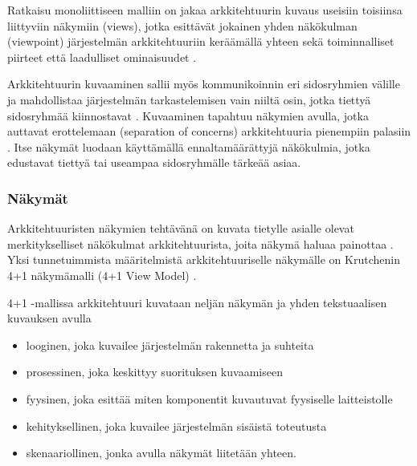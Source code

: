 \documentclass[finnish]{tktltiki2}
\theoremstyle{definition}
\theoremstyle{remark}
\begin{document}
Ratkaisu monoliittiseen malliin on jakaa arkkitehtuurin kuvaus useisiin toisiinsa liittyviin näkymiin (views), jotka esittävät jokainen yhden näkökulman (viewpoint) järjestelmän arkkitehtuuriin keräämällä yhteen sekä toiminnalliset piirteet että laadulliset ominaisuudet \citetext{\citealp[s. 33-34]{Rozanski:2011:SSA:2072649}; \citealp[s. 8-9]{gorton_understanding_2011}; \citealp[s. 117]{Ran:1998:ASV:288408.288438}}.

Arkkitehtuurin kuvaaminen sallii myös kommunikoinnin eri sidosryhmien välille ja mahdollistaa järjestelmän tarkastelemisen vain niiltä osin, jotka tiettyä sidosryhmää kiinnostavat \citetext{\citealp[s. 329]{ARaHVeSCiSDu}; \citealp[s. 60]{Brondum:2010:TAV:1833335.1833344}}. Kuvaaminen tapahtuu näkymien avulla, jotka auttavat erottelemaan (separation of concerns) arkkitehtuuria pienempiin palasiin \citep[s. 2]{Galster:2011:DTC:2031759.2031761}. Itse näkymät luodaan käyttämällä ennaltamäärättyjä näkökulmia, jotka edustavat tiettyä tai useampaa sidosryhmälle tärkeää asiaa. 


\subsubsection{Näkymät}
Arkkitehtuuristen näkymien tehtävänä on kuvata tietylle asialle olevat merkitykselliset näkökulmat arkkitehtuurista, joita näkymä haluaa painottaa \citetext{\citealp[s. 34]{Rozanski:2011:SSA:2072649}; \citealp[s. 15]{may2005survey}}. Yksi tunnetuimmista määritelmistä arkkitehtuuriselle näkymälle on Krutchenin 4+1 näkymämalli (4+1 View Model) \citep[s.7-8]{gorton_understanding_2011}. 

4+1 -mallissa arkkitehtuuri kuvataan neljän näkymän ja yhden tekstuaalisen kuvauksen avulla 

\begin{itemize}
	\item looginen, joka kuvailee järjestelmän rakennetta ja suhteita
	\item prosessinen, joka keskittyy suorituksen kuvaamiseen
	\item fyysinen, joka esittää miten komponentit kuvautuvat fyysiselle laitteistolle
	\item kehityksellinen, joka kuvailee järjestelmän sisäistä toteutusta
	\item skenaariollinen, jonka avulla näkymät liitetään yhteen.
\end{itemize}
\end{document}

